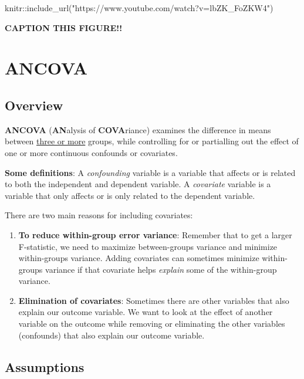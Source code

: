 \documentclass[
]{book}
\newenvironment{Shaded}{\begin{snugshade}}{\end{snugshade}}
\newcommand{\FunctionTok}[1]{\textcolor[rgb]{0.00,0.00,0.00}{#1}}
\newcommand{\NormalTok}[1]{#1}
\newcommand{\SpecialCharTok}[1]{\textcolor[rgb]{0.00,0.00,0.00}{#1}}
\newcommand{\StringTok}[1]{\textcolor[rgb]{0.31,0.60,0.02}{#1}}
\begin{document}
\begin{Shaded}
\begin{Highlighting}[]
\NormalTok{knitr}\SpecialCharTok{::}\FunctionTok{include\_url}\NormalTok{(}\StringTok{"https://www.youtube.com/watch?v=lbZK\_FoZKW4"}\NormalTok{)}
\end{Highlighting}
\end{Shaded}

\label{fig:unnamed-chunk-3}\textbf{CAPTION THIS FIGURE!!}

\hypertarget{ancova}{%
\section{ANCOVA}\label{ancova}}

\hypertarget{overview-9}{%
\subsection{Overview}\label{overview-9}}

\textbf{ANCOVA} (\textbf{AN}alysis of \textbf{COVA}riance) examines the difference in means between \underline{three or more} groups, while controlling for or partialling out the effect of one or more continuous confounds or covariates.

\textbf{Some definitions}: A \emph{confounding} variable is a variable that affects or is related to both the independent and dependent variable. A \emph{covariate} variable is a variable that only affects or is only related to the dependent variable.

There are two main reasons for including covariates:

\begin{enumerate}
\def\labelenumi{\arabic{enumi}.}
\item
  \textbf{To reduce within-group error variance}: Remember that to get a larger F-statistic, we need to maximize between-groups variance and minimize within-groups variance. Adding covariates can sometimes minimize within-groups variance if that covariate helps \emph{explain} some of the within-group variance.
\item
  \textbf{Elimination of covariates}: Sometimes there are other variables that also explain our outcome variable. We want to look at the effect of another variable on the outcome while removing or eliminating the other variables (confounds) that also explain our outcome variable.
\end{enumerate}

\hypertarget{assumptions-5}{%
\subsection{Assumptions}\label{assumptions-5}}
\end{document}
